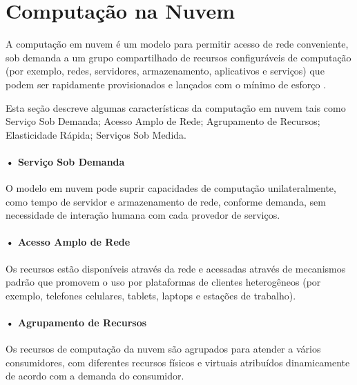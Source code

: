 \documentclass[portuguese,oneside]{tcc}
\begin{document}


\section{Computação na Nuvem}
A computação em nuvem é um modelo para permitir acesso de rede conveniente, sob demanda a um grupo compartilhado de recursos configuráveis de computação (por exemplo, redes, servidores, armazenamento, aplicativos e serviços) que podem ser rapidamente provisionados e lançados com o mínimo de esforço \cite{NIST}.

Esta seção descreve algumas características da computação em nuvem tais como Serviço Sob Demanda; Acesso Amplo de Rede; Agrupamento de Recursos; Elasticidade Rápida; Serviços Sob Medida.

\paragraph*{• Serviço Sob Demanda}
O modelo em nuvem pode suprir capacidades de computação unilateralmente, como tempo de servidor e armazenamento de rede, conforme demanda, sem necessidade de interação humana com cada provedor de serviços.

\paragraph*{• Acesso Amplo de Rede}
Os recursos estão disponíveis através da rede e acessadas através de mecanismos padrão que promovem o uso por plataformas de clientes heterogêneos (por exemplo, telefones celulares, tablets, laptops e estações de trabalho).

\paragraph*{• Agrupamento de Recursos}
Os recursos de computação da nuvem são agrupados para atender a vários consumidores, com diferentes recursos físicos e virtuais atribuídos dinamicamente de acordo com a demanda do consumidor.
\end{document}
